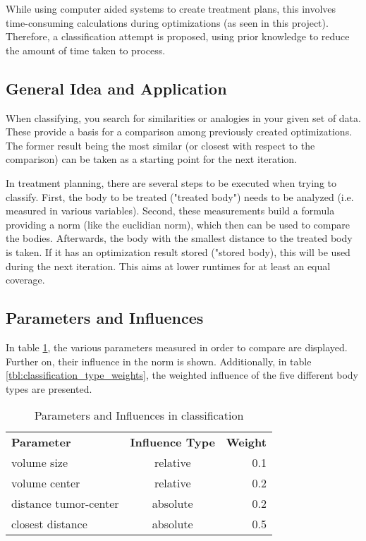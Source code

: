 While using computer aided systems to create treatment plans, this involves time-consuming calculations during optimizations (as seen in this project). Therefore, a classification attempt is proposed, using prior knowledge to reduce the amount of time taken to process.

\subsection{General Idea and Application}
When classifying, you search for similarities or analogies in your given set of data. These provide a basis for a comparison among previously created optimizations. The former result being the most similar (or closest with respect to the comparison) can be taken as a starting point for the next iteration.

In treatment planning, there are several steps to be executed when trying to classify. First, the body to be treated ("treated body") needs to be analyzed (i.e. measured in various variables). Second, these measurements build a formula providing a norm (like the euclidian norm), which then can be used to compare the bodies. Afterwards, the body with the smallest distance to the treated body is taken. If it has an optimization result stored ("stored body), this will be used during the next iteration. This aims at lower runtimes for at least an equal coverage.

\subsection{Parameters and Influences}
In table \ref{tbl:classification_parameters}, the various parameters measured in order to compare are displayed. Further on, their influence in the norm is shown. Additionally, in table \ref{tbl:classification_type_weights}, the weighted influence of the five different body types are presented.
\begin{table}
\centering
\caption{Parameters and Influences in classification}
\begin{tabular}[htbp]{l | c | r}
\textbf{Parameter} & \textbf{Influence Type} & \textbf{Weight} \\
volume size  & relative & 0.1\\
volume center & relative & 0.2 \\
distance tumor-center & absolute & 0.2\\
closest distance & absolute & 0.5
\end{tabular}
\label{tbl:classification_parameters}
\end{table}

